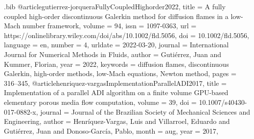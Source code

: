 %
\RequirePackage{filecontents}
\begin{filecontents*}{\jobname.bib}
@article{gutierrez-jorqueraFullyCoupledHighorder2022,
	title = {A fully coupled high-order discontinuous {Galerkin} method for diffusion flames in a low-{Mach} number framework},
	volume = {94},
	issn = {1097-0363},
	url = {https://onlinelibrary.wiley.com/doi/abs/10.1002/fld.5056},
	doi = {10.1002/fld.5056},
	language = {en},
	number = {4},
	urldate = {2022-03-20},
	journal = {International Journal for Numerical Methods in Fluids},
	author = {Gutiérrez, Juan and Kummer, Florian},
	year = {2022},
	keywords = {diffusion flames, discontinuous Galerkin, high-order methods, low-Mach equations, Newton method},
	pages = {316--345},
}
@article{henriquez-vargasImplementationParallelADI2017,
	title = {Implementation of a parallel {ADI} algorithm on a finite volume {GPU}-based elementary porous media flow computation},
	volume = {39},
	doi = {10.1007/s40430-017-0882-x},
	journal = {Journal of the Brazilian Society of Mechanical Sciences and Engineering},
	author = {Henríquez-Vargas, Luis and Villarroel, Eduardo and Gutiérrez, Juan and Donoso-García, Pablo},
	month = aug,
	year = {2017},
}
\end{filecontents*}

\documentclass[11pt,a4paper,sans]{moderncv}        %
\usepackage{etoolbox}


